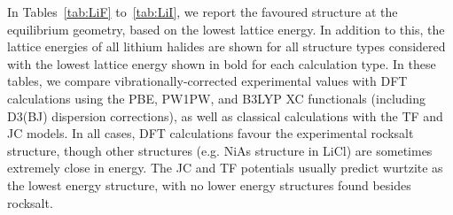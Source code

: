 \documentclass[titlepage,11pt]{article}
\begin{document}
In Tables~\ref{tab:LiF} to~\ref{tab:LiI}, we report the favoured structure at the equilibrium geometry, based on the lowest lattice energy. In addition to this, the lattice energies of all lithium halides are shown for all structure types considered with the lowest lattice energy shown in bold for each calculation type. In these tables, we compare vibrationally-corrected experimental values with DFT calculations using the PBE, PW1PW, and B3LYP XC functionals (including D3(BJ) dispersion corrections), as well as classical calculations with the TF and JC models. In all cases, DFT calculations favour the experimental rocksalt structure, though other structures (e.g. NiAs structure in LiCl) are sometimes extremely close in energy. The JC and TF potentials usually predict wurtzite as the lowest energy structure, with no lower energy structures found besides rocksalt.
\end{document}
